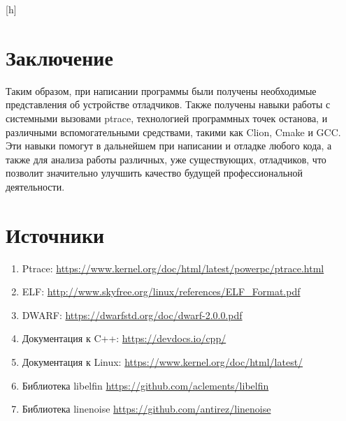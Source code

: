 \documentclass[oneside,final,14pt]{extreport}
\makeatletter
\renewenvironment{figure}[1][\fps@figure]{
	\edef\@tempa{\noexpand\@float{figure}[#1]}
	\@tempa
	\addtocounter{figurecounter}{1}
}{
	\end@float
}
\makeatother
\begin{document}
\begin{figure}[h]
	\centering
	\begin{singlespacing}
		
	\end{singlespacing}
	\caption{Шаг без захода}
\end{figure}


\chapter*{Заключение}
Таким образом, при написании программы были получены необходимые представления об устройстве отладчиков. Также получены навыки работы с системными вызовами ptrace, технологией программных точек останова, и различными вспомогательными средствами, такими как Clion, Cmake и GCC. Эти навыки помогут в дальнейшем при написании и отладке любого кода, а также для анализа работы различных, уже существующих, отладчиков, что позволит значительно улучшить качество будущей профессиональной деятельности.

\chapter*{Источники}
\begin{enumerate}
	\item Ptrace: \url{ https://www.kernel.org/doc/html/latest/powerpc/ptrace.html}
	\item ELF: \url{ http://www.skyfree.org/linux/references/ELF_Format.pdf}
	\item DWARF: \url{ https://dwarfstd.org/doc/dwarf-2.0.0.pdf}
	\item Документация к C++:  \url{https://devdocs.io/cpp/}
	\item Документация к Linux: \url{ https://www.kernel.org/doc/html/latest/}
	\item Библиотека libelfin \url {https://github.com/aclements/libelfin}
	\item Библиотека linenoise \url {https://github.com/antirez/linenoise}
\end{enumerate}
\end{document}
